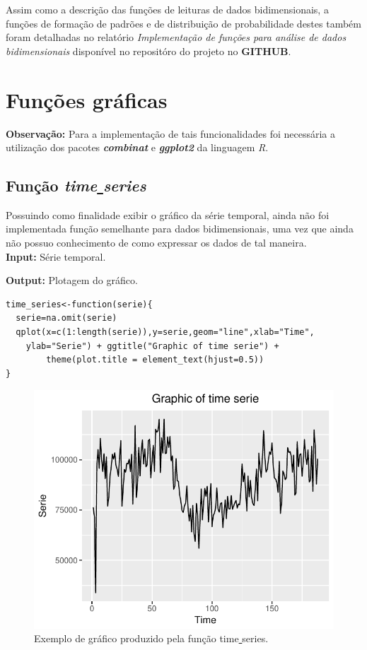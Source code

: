 \documentclass[12pt,letterpaper]{article}
\begin{document}
Assim como a descrição das funções de leituras de dados bidimensionais, a funções de formação de padrões e de distribuição de probabilidade destes também foram detalhadas no relatório \textit{Implementação de funções para análise de dados bidimensionais} disponível no repositóro do projeto no \textbf{GITHUB}.

\section{Funções gráficas}

\textbf{Observação:} Para a implementação de tais funcionalidades foi necessária a utilização dos pacotes \textit{\textbf{combinat}} e \textit{\textbf{ggplot2}} da linguagem \textit{R}.

\subsection{Função \textit{time\underline{ }series}}

Possuindo como finalidade exibir o gráfico da série temporal, ainda não foi implementada função semelhante para dados bidimensionais, uma vez que ainda não possuo conhecimento de como expressar os dados de tal maneira.\\

\textbf{Input: } Série temporal.

\textbf{Output: } Plotagem do gráfico.\\

\begin{lstlisting}
time_series<-function(serie){
  serie=na.omit(serie)
  qplot(x=c(1:length(serie)),y=serie,geom="line",xlab="Time",
  	ylab="Serie") + ggtitle("Graphic of time serie") + 
    	theme(plot.title = element_text(hjust=0.5))
}

\end{lstlisting}

\begin{figure}[!hbt]
	\begin{center}
		\includegraphics[width=\columnwidth]{time_serie.pdf}
		\caption{Exemplo de gráfico produzido pela função time\underline{ }series.}
		\label{fig:time_serie.pdf}
	\end{center}
\end{figure}
\end{document}
